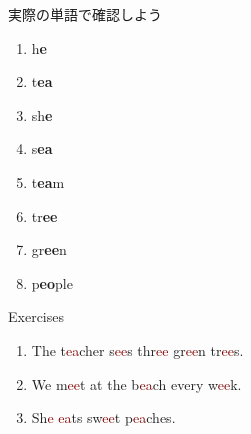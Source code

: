 \documentclass[aspectratio=169,xcolor={dvipsnames,table}]{beamer}
\begin{document}
\begin{frame}[plain]{実際の単語で確認しよう}
\LARGE

\begin{enumerate}
 \item h\textcolor{NavyBlue}{\bfseries e}%
\hfill{}\hspace{150pt}\mbox{}

\item t\textcolor{NavyBlue}{\bfseries ea}%
\hfill{}\hspace{150pt}\mbox{}
 \item sh\textcolor{NavyBlue}{\bfseries e}%
\hfill{}\hspace{150pt}\mbox{}
 \item s\textcolor{NavyBlue}{\bfseries ea}%
\hfill{}\hspace{150pt}\mbox{}
 \item t\textcolor{NavyBlue}{\bfseries ea}m%
\hfill{}\hspace{150pt}\mbox{}
 \item tr\textcolor{NavyBlue}{\bfseries ee}%
\hfill{}\hspace{150pt}\mbox{}
 \item gr\textcolor{NavyBlue}{\bfseries ee}n%
\hfill{}\hspace{150pt}\mbox{}
 \item p\textcolor{NavyBlue}{\bfseries eo}ple%
\hfill{}\hspace{150pt}\mbox{}

\end{enumerate}
\end{frame}
\begin{frame}[plain]{Exercises}
\LARGE

\begin{enumerate}
 \item The t\textcolor{Maroon}{ea}cher s\textcolor{Maroon}{ee}s thr\textcolor{Maroon}{ee} gr\textcolor{Maroon}{ee}n tr\textcolor{Maroon}{ee}s.
 \item We m\textcolor{Maroon}{ee}t at the b\textcolor{Maroon}{ea}ch every w\textcolor{Maroon}{ee}k.
 \item Sh\textcolor{Maroon}{e} \textcolor{Maroon}{ea}ts sw\textcolor{Maroon}{ee}t p\textcolor{Maroon}{ea}ches.

\end{enumerate}
\end{frame}
\end{document}
